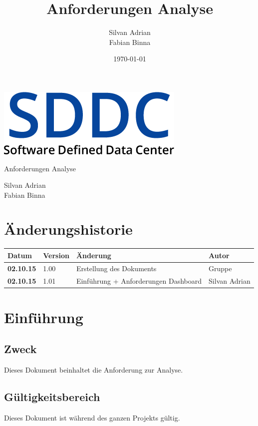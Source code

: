 \documentclass[11pt]{scrartcl}
\title{Anforderungen Analyse}
\author{Silvan Adrian \\ Fabian Binna}
\date{\today{}}
\begin{document}
\def\arraystretch{1.5}
\begin{titlepage}
\begin{center}
\vspace{10em}
\includegraphics[scale=2]{SDDC}
\vspace{10em}
\end{center}
\begin{center}
\huge {Anforderungen Analyse}
\end{center}
\begin{center}
\vspace{10em}
\LARGE {Silvan Adrian} \\
\LARGE {Fabian Binna}
\end{center}

\end{titlepage}

\newpage
\section{Änderungshistorie}
\begin{tabularx}{\linewidth}{l l X l}
\textbf{Datum} & \textbf{Version} & \textbf{Änderung}  & \textbf{Autor} \\
\hline
\textbf{02.10.15} & 1.00 & Erstellung des Dokuments & Gruppe \\
\textbf{02.10.15} & 1.01 & Einführung + Anforderungen Dashboard & Silvan Adrian\\
\end{tabularx}

\newpage
\tableofcontents
\newpage

\section{Einführung}
\subsection{Zweck}
Dieses Dokument beinhaltet die Anforderung zur Analyse.
\subsection{Gültigkeitsbereich}
Dieses Dokument ist während des ganzen Projekts gültig.
\end{document}
